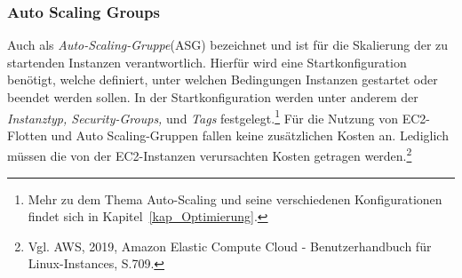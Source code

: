 \subsubsection*{Auto Scaling Groups}%
Auch als \textit{Auto-Scaling-Gruppe}(ASG) bezeichnet und ist für die Skalierung der zu startenden Instanzen verantwortlich. Hierfür wird eine Startkonfiguration benötigt, welche definiert, unter welchen Bedingungen Instanzen gestartet oder beendet werden sollen. In der Startkonfiguration werden unter anderem der \textit{Instanztyp, Security-Groups,} und \textit{Tags} festgelegt.\footnote{Mehr zu dem Thema Auto-Scaling und seine verschiedenen Konfigurationen findet sich in Kapitel~\ref{kap_Optimierung}.} Für die Nutzung von EC2-Flotten und Auto Scaling-Gruppen fallen keine zusätzlichen Kosten an. Lediglich müssen die von der EC2-Instanzen verursachten Kosten getragen werden.\footnote{Vgl. AWS, 2019, Amazon Elastic Compute Cloud - Benutzerhandbuch für Linux-Instances, S.709\cite{AMZ26}. }

